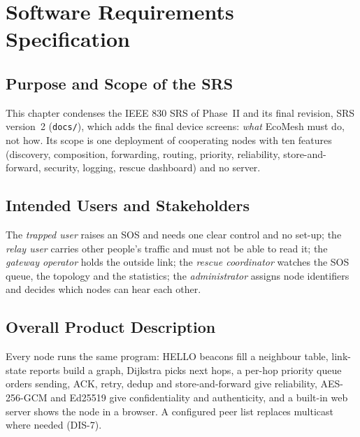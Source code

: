 \section{Software Requirements Specification}
\label{ch:srs}

\subsection{Purpose and Scope of the SRS}
This chapter condenses the IEEE 830 SRS of Phase~II and its final revision, SRS version~2 (\texttt{docs/}), which adds the final device screens: \emph{what} EcoMesh must do, not how. Its scope is one deployment of cooperating nodes with ten features (discovery, composition, forwarding, routing, priority, reliability, store-and-forward, security, logging, rescue dashboard) and no server.
\subsection{Intended Users and Stakeholders}
The \emph{trapped user} raises an SOS and needs one clear control and no set-up; the \emph{relay user} carries other people's traffic and must not be able to read it; the \emph{gateway operator} holds the outside link; the \emph{rescue coordinator} watches the SOS queue, the topology and the statistics; the \emph{administrator} assigns node identifiers and decides which nodes can hear each other.

\subsection{Overall Product Description}
Every node runs the same program: HELLO beacons fill a neighbour table, link-state reports build a graph, Dijkstra picks next hops, a per-hop priority queue orders sending, ACK, retry, dedup and store-and-forward give reliability, AES-256-GCM and Ed25519 give confidentiality and authenticity, and a built-in web server shows the node in a browser. A configured peer list replaces multicast where needed (DIS-7).
